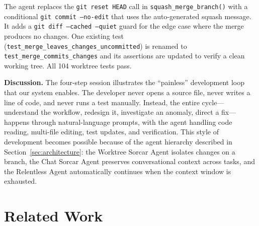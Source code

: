 \documentclass{article}
\begin{document}
\noindent The agent replaces the \texttt{git reset HEAD} call in \texttt{squash\_merge\_branch()} with a conditional \texttt{git commit --no-edit} that uses the auto-generated squash message.  It adds a \texttt{git diff --cached --quiet} guard for the edge case where the merge produces no changes.  One existing test (\texttt{test\_merge\_leaves\_changes\_uncommitted}) is renamed to \texttt{test\_merge\_commits\_changes} and its assertions are updated to verify a clean working tree.  All 104 worktree tests pass.

\medskip
\noindent\textbf{Discussion.} The four-step session illustrates the ``painless'' development loop that our system enables.  The developer never opens a source file, never writes a line of code, and never runs a test manually.  Instead, the entire cycle---understand the workflow, redesign it, investigate an anomaly, direct a fix---happens through natural-language prompts, with the agent handling code reading, multi-file editing, test updates, and verification.  This style of development becomes possible because of the agent hierarchy described in Section~\ref{sec:architecture}: the Worktree Sorcar Agent isolates changes on a branch, the Chat Sorcar Agent preserves conversational context across tasks, and the Relentless Agent automatically continues when the context window is exhausted.

\section{Related Work}
\label{sec:related}
\end{document}
